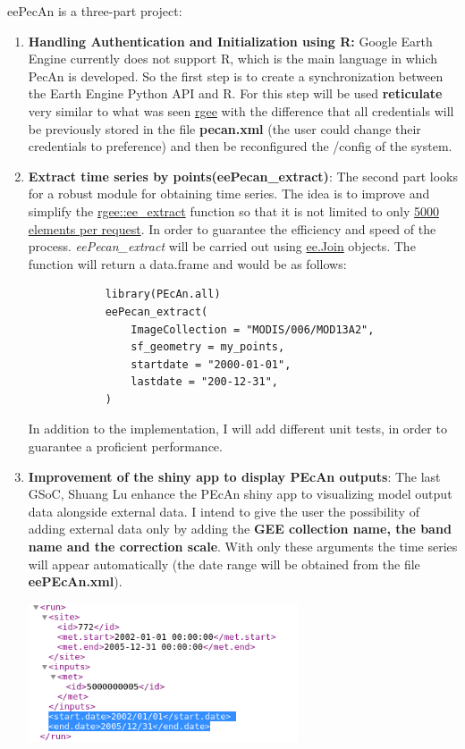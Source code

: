 \documentclass{eepecan}
\begin{document}
	\noindent eePecAn is a three-part project:
	
	
	\begin{enumerate}
		\item \textbf{Handling Authentication and Initialization using R:} Google Earth Engine currently does not support R, which is the main language in which PecAn is developed.  So the first step is to create a synchronization between the Earth Engine Python API and R. For this step will be used \textbf{reticulate } very similar to what was seen \href{https://github.com/csaybar/rgee}{rgee} with the difference that all credentials will be previously stored in the file \textbf{pecan.xml} (the user could change their credentials to preference) and then be reconfigured the /config of the system.
		
		\item \textbf{Extract time series by points(eePecan\_extract)}: The second part looks for a robust module for obtaining time series. The idea is to improve and simplify the \href{https://csaybar.github.io/rgee/reference/ee_extract.html}{rgee::ee\_extract} function so that it is not limited to only \href{https://developers.google.com/earth-engine/ic_info}{5000 elements per request}. In order to guarantee the efficiency and speed of the process. \emph{eePecan\_extract} will be carried out using \href{https://developers.google.com/earth-engine/joins_intro}{ee.Join} objects. The function will return a data.frame and would be as follows:
		
		\begin{lstlisting}
			library(PEcAn.all)
			eePecan_extract(
				ImageCollection = "MODIS/006/MOD13A2",
				sf_geometry = my_points,
				startdate = "2000-01-01",
				lastdate = "200-12-31",
			)
		\end{lstlisting}
		In addition to the implementation, I will add different unit tests, in order to guarantee a proficient performance.
		
		\item {\textbf{Improvement of the shiny app to display PEcAn outputs}}: The last GSoC, Shuang Lu enhance the PEcAn shiny app to visualizing model output data alongside external data. I intend to give the user the possibility of adding external data only by adding the \textbf{GEE collection name, the band name and the correction scale}. With only these arguments the time series will appear automatically (the date range will be obtained from the file \textbf{eePEcAn.xml}).
		
		\begin{novspacecenter}
			\includegraphics[width=80mm]{figures/fig04_xml}
			\label{fig:fig01main}
		\end{novspacecenter}
	\end{enumerate}
	
\end{document}
